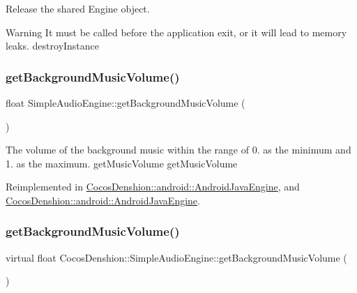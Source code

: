Release the shared Engine object.

\begin{DoxyWarning}{Warning}
It must be called before the application exit, or it will lead to memory leaks.  destroy\+Instance 
\end{DoxyWarning}
\mbox{\label{classCocosDenshion_1_1SimpleAudioEngine_a393d453216f76884e92cf010ba926330}} 
\subsubsection{\texorpdfstring{get\+Background\+Music\+Volume()}{getBackgroundMusicVolume()}\hspace{0.1cm}{\footnotesize\ttfamily [1/2]}}
{\footnotesize\ttfamily float Simple\+Audio\+Engine\+::get\+Background\+Music\+Volume (\begin{DoxyParamCaption}{ }\end{DoxyParamCaption})\hspace{0.3cm}{\ttfamily [virtual]}}

The volume of the background music within the range of 0. as the minimum and 1. as the maximum.  get\+Music\+Volume  get\+Music\+Volume 

Reimplemented in \hyperlink{classCocosDenshion_1_1android_1_1AndroidJavaEngine_ae645138af1efe4007a90acd55fa55233}{Cocos\+Denshion\+::android\+::\+Android\+Java\+Engine}, and \hyperlink{classCocosDenshion_1_1android_1_1AndroidJavaEngine_ab9c6ae5e936cb51283f804e163947e2c}{Cocos\+Denshion\+::android\+::\+Android\+Java\+Engine}.

\mbox{\label{classCocosDenshion_1_1SimpleAudioEngine_ae9caf4160ddc26d281a9f737b5c90e1b}} 
\subsubsection{\texorpdfstring{get\+Background\+Music\+Volume()}{getBackgroundMusicVolume()}\hspace{0.1cm}{\footnotesize\ttfamily [2/2]}}
{\footnotesize\ttfamily virtual float Cocos\+Denshion\+::\+Simple\+Audio\+Engine\+::get\+Background\+Music\+Volume (\begin{DoxyParamCaption}{ }\end{DoxyParamCaption})\hspace{0.3cm}{\ttfamily [virtual]}}


